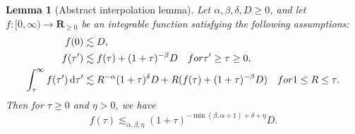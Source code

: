 \documentclass[10pt,a4paper]{amsart}
\newtheorem{lemma}{Lemma}
\newcommand{\R}{\mathbf{R}}
\newcommand{\dd}{\mathop{}\!\dletter}
\newcommand{\dletter}{\mathrm{d}}
\begin{document}
\begin{lemma}[Abstract interpolation lemma]
Let \(\alpha{},\beta{},\delta{},D\ge 0\), and let \(f:[0,\infty)\to
\R_{\ge 0}\) be an integrable function satisfying the following assumptions:
\begin{align}
f(0)&\lesssim D,\label{data-bound}\\
f(\tau{}')&\lesssim f(\tau{}) + (1+\tau{})^{-\beta{}}D\quad \textnormal{for }\tau{}'\ge \tau{}\ge 0, \label{energy-bound}\\
\int_{\tau{}}^{\infty} f(\tau{}')\dd{}\tau{}'&\lesssim R^{-\alpha{}}(1+\tau{})^\delta{}D + R(f(\tau{}) + (1+\tau{})^{-\beta{}}D)\quad \textnormal{for }1\le R\le \tau{}. \label{dyadic-bound}
\end{align}
Then for \(\tau{}\ge 0\) and \(\eta{} > 0\), we have
\begin{equation}\label{iteration-conc}
f(\tau{})\lesssim_{\alpha{},\beta{},\eta{}} (1+\tau{})^{-\min (\beta{},\alpha{}+1) + \delta{} + \eta{}}D.
\end{equation}
\label{interpolation}
\end{lemma}
\end{document}

